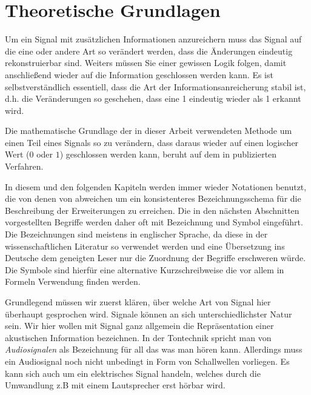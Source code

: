 \chapter{Theoretische Grundlagen}
\label{ch:theorie}

Um ein Signal mit zus\"atzlichen Informationen anzureichern muss das Signal auf die eine oder andere Art so ver\"andert werden, dass die Änderungen eindeutig rekonstruierbar sind. Weiters m\"ussen Sie einer gewissen Logik folgen, damit anschlie{\ss}end wieder auf die Information geschlossen werden kann. Es ist selbstverst\"andlich essentiell, dass die Art der Informationsanreicherung stabil ist, d.h. die Ver\"anderungen so geschehen, dass eine 1 eindeutig wieder als 1 erkannt wird.
	
Die mathematische Grundlage der in dieser Arbeit verwendeten Methode um einen Teil eines Signals so zu verändern, dass daraus wieder auf einen logischer Wert ($0$ oder $1$) geschlossen werden kann, beruht auf dem in \cite{xiang2007robust} publizierten Verfahren.

In diesem und den folgenden Kapiteln werden immer wieder Notationen benutzt, die von denen von \cite{xiang2007robust} abweichen um ein konsistenteres Bezeichnungsschema für die Beschreibung der Erweiterungen zu erreichen. Die in den nächsten Abschnitten vorgestellten Begriffe werden daher oft mit Bezeichnung und Symbol eingeführt. Die Bezeichnungen sind meistens in englischer Sprache, da diese in der wissenschaftlichen Literatur so verwendet werden und eine Übersetzung ins Deutsche dem geneigten Leser nur die Zuordnung der Begriffe erschweren w\"urde. Die Symbole sind hierf\"ur eine alternative Kurzschreibweise die vor allem in Formeln Verwendung finden werden. 

Grundlegend müssen wir zuerst klären, über welche Art von Signal hier überhaupt gesprochen wird. Signale können an sich unterschiedlichster Natur sein. Wir hier wollen mit \glqq{}Signal\grqq{} ganz allgemein die Repräsentation einer akustischen Information bezeichnen. In der Tontechnik spricht man von \textit{Audiosignalen} als Bezeichnung für all das \glqq{}was man hören kann\grqq{}. Allerdings muss ein Audiosignal noch nicht unbedingt in Form von Schallwellen vorliegen. Es kann sich auch um ein elektrisches Signal handeln, welches durch die Umwandlung z.B mit einem Lautsprecher erst hörbar wird. 

